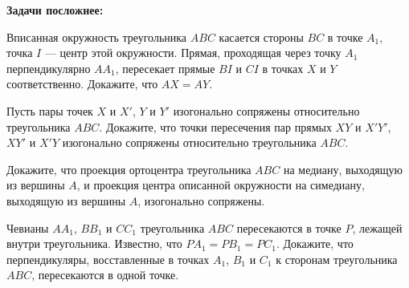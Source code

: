 \documentclass{article}
\begin{document}
\begin{enumerate_boxed}
        \textbf{Задачи посложнее:}

        \item Вписанная окружность треугольника \(ABC\) касается стороны \(BC\) в точке \(A_1\), точка \(I\) — центр этой окружности.
        Прямая, проходящая через точку \(A_1\) перпендикулярно \(AA_1\), пересекает прямые \(BI\) и \(CI\) в точках \(X\) и \(Y\) соответственно.
        Докажите, что \(AX = AY\).

        \item Пусть пары точек \(X\) и \(X'\), \(Y\) и \(Y'\) изогонально сопряжены относительно треугольника \(ABC\).
        Докажите, что точки пересечения пар прямых \(XY\) и \(X'Y'\), \(XY'\) и \(X'Y\) изогонально сопряжены относительно треугольника \(ABC\).

        \item Докажите, что проекция ортоцентра треугольника \(ABC\) на медиану, выходящую из вершины \(A\), и проекция центра описанной окружности на симедиану, выходящую из вершины \(A\), изогонально сопряжены.

        \item Чевианы \(AA_1\), \(BB_1\) и \(CC_1\) треугольника \(ABC\) пересекаются в точке \(P\), лежащей внутри треугольника.
        Известно, что \(PA_1 = PB_1 = PC_1\).
        Докажите, что перпендикуляры, восставленные в точках \(A_1\), \(B_1\) и \(C_1\) к сторонам треугольника \(ABC\), пересекаются в одной точке.

    \end{enumerate_boxed}
\end{document}
